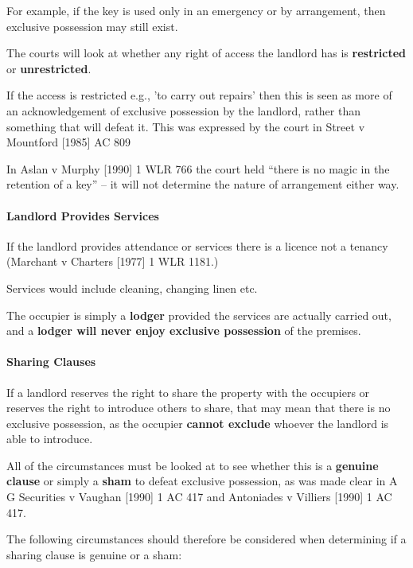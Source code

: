 \documentclass[
]{article}
\begin{document}
For example, if the key is used only in an emergency or by arrangement,
then exclusive possession may still exist.

The courts will look at whether any right of access the landlord has is
\textbf{restricted} or \textbf{unrestricted}.

If the access is restricted e.g., 'to carry out repairs' then this is
seen as more of an acknowledgement of exclusive possession by the
landlord, rather than something that will defeat it. This was expressed
by the court in Street v Mountford {[}1985{]} AC 809

In Aslan v Murphy {[}1990{]} 1 WLR 766 the court held ``there is no
magic in the retention of a key'' -- it will not determine the nature of
arrangement either way.

\hypertarget{landlord-provides-services}{%
\paragraph{Landlord Provides
Services}\label{landlord-provides-services}}

If the landlord provides attendance or services there is a licence not a
tenancy (Marchant v Charters {[}1977{]} 1 WLR 1181.)

Services would include cleaning, changing linen etc.

The occupier is simply a \textbf{lodger} provided the services are
actually carried out, and a \textbf{lodger will never enjoy exclusive
possession} of the premises.

\hypertarget{sharing-clauses}{%
\paragraph{Sharing Clauses}\label{sharing-clauses}}

If a landlord reserves the right to share the property with the
occupiers or reserves the right to introduce others to share, that may
mean that there is no exclusive possession, as the occupier
\textbf{cannot exclude} whoever the landlord is able to introduce.

All of the circumstances must be looked at to see whether this is a
\textbf{genuine clause} or simply a \textbf{sham} to defeat exclusive
possession, as was made clear in A G Securities v Vaughan {[}1990{]} 1
AC 417 and Antoniades v Villiers {[}1990{]} 1 AC 417.

The following circumstances should therefore be considered when
determining if a sharing clause is genuine or a sham:
\end{document}
